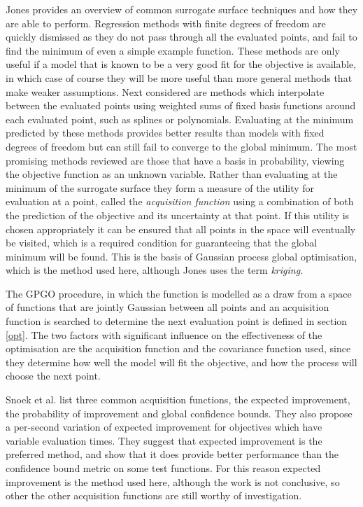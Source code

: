 \documentclass[a4paper, 10 pt, conference]{ieeeconf}  %
\begin{document}
Jones \cite{jones2001taxonomy} provides an overview of common surrogate surface techniques and how they are able to perform. Regression methods with finite degrees of freedom are quickly dismissed as they do not pass through all the evaluated points, and fail to find the minimum of even a simple example function. These methods are only useful if a model that is known to be a very good fit for the objective is available, in which case of course they will be more useful than more general methods that make weaker assumptions.
Next considered are methods which interpolate between the evaluated points using weighted sums of fixed basis functions around each evaluated point, such as splines or polynomials. Evaluating at the minimum predicted by these methods provides better results than models with fixed degrees of freedom but can still fail to converge to the global minimum.
The most promising methods reviewed are those that have a basis in probability, viewing the objective function as an unknown variable. Rather than evaluating at the minimum of the surrogate surface they form a measure of the utility for evaluation at a point, called the \emph{acquisition function} using a combination of both the prediction of the objective and its uncertainty at that point. If this utility is chosen appropriately it can be ensured that all points in the space will eventually be visited, which is a required condition for guaranteeing that the global minimum will be found. This is the basis of Gaussian process global optimisation, which is the method used here, although Jones uses the term \emph{kriging}.

The GPGO procedure, in which the function is modelled as a draw from a space of functions that are jointly Gaussian between all points and an acquisition function is searched to determine the next evaluation point is defined in section \ref{opt}. The two factors with significant influence on the effectiveness of the optimisation are the acquisition function and the covariance function used, since they determine how well the model will fit the objective, and how the process will choose the next point.


Snoek et al. \cite{snoek2012practical} list three common acquisition functions, the expected improvement, the probability of improvement and global confidence bounds. They also propose a per-second variation of expected improvement for objectives which have variable evaluation times. They suggest that expected improvement is the preferred method, and show that it does provide better performance than the confidence bound metric on some test functions. For this reason expected improvement is the method used here, although the work is not conclusive, so other the other acquisition functions are still worthy of investigation.
\end{document}
